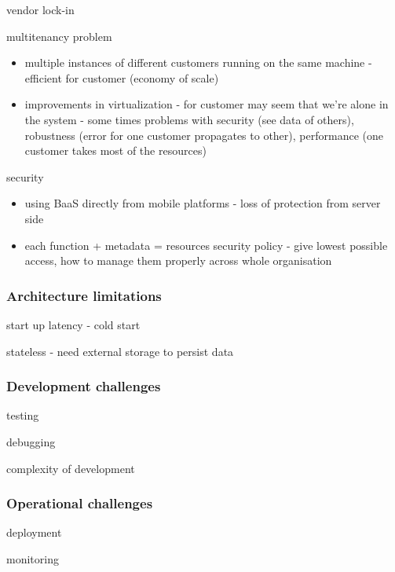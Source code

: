 vendor lock-in

multitenancy problem

\begin{itemize}
    \item multiple instances of different customers running on the same machine - efficient for customer (economy of scale)
    \item improvements in virtualization - for customer may seem that we're alone in the system - some times problems with security (see data of others), robustness (error for one customer propagates to other), performance (one customer takes most of the resources)
\end{itemize}

security

\begin{itemize}
    \item using BaaS directly from mobile platforms - loss of protection from server side
    \item each function + metadata = resources security policy - give lowest possible access, how to manage them properly across whole organisation
\end{itemize}

\subsubsection*{Architecture limitations}

start up latency - cold start

stateless - need external storage to persist data

\subsubsection*{Development challenges}

testing

debugging

complexity of development

\subsubsection*{Operational challenges}

deployment

monitoring


 
